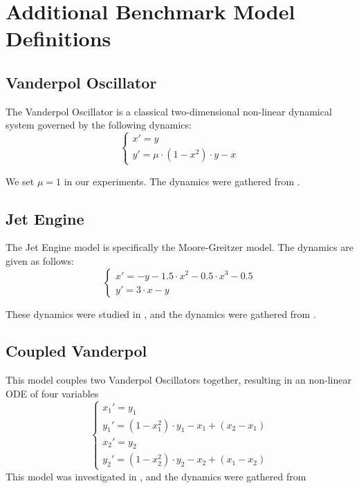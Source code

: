 \appendix

\chapter{Additional Benchmark Model Definitions}
\label{app:benchmark}

\section{Vanderpol Oscillator}
\label{sec:vdp}
The Vanderpol Oscillator is a classical two-dimensional non-linear dynamical system governed by the following dynamics:
\begin{equation}
  \begin{cases}
  x' = y \\
  y' = \mu \cdot(1 - x^2)\cdot y - x
  \end{cases}
 \end{equation}

 We set $\mu = 1$ in our experiments. The dynamics were gathered from \cite{aachen}.


\section{Jet Engine}
The Jet Engine model is specifically the Moore-Greitzer model. The dynamics are given as follows:
\begin{equation}
  \begin{cases}
  x' = -y - 1.5\cdot x^2 - 0.5\cdot x^3 - 0.5 \\
  y' = 3\cdot x - y
  \end{cases}
 \end{equation}

\noindent These dynamics were studied in \cite{aylward2008stability}, and the dynamics were gathered from \cite{aachen}.

\section{Coupled Vanderpol}
This model couples two Vanderpol Oscillators together, resulting in an non-linear ODE of four variables
\begin{equation}
  \begin{cases}
  x_1' = y_1\\
  y_1' = (1-x_1^2)\cdot y_1 - x_1 + (x_2 - x_1) \\
  x_2 ' = y_2 \\
  y_2' = (1-x_2^2)\cdot y_2 - x_2 + (x_1 - x_2)
  \end{cases}
 \end{equation}
\noindent This model was investigated in \cite{rand1980bifurcation}, and the dynamics were gathered from \cite{aachen}

